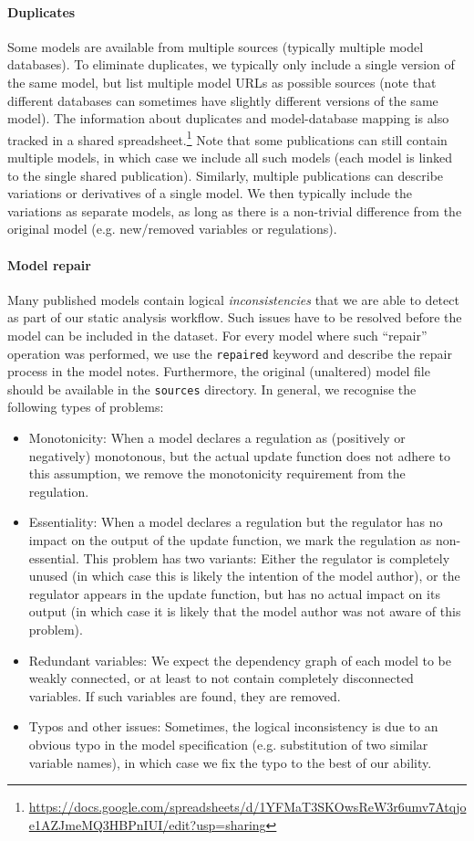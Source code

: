 \documentclass{article}
\begin{document}
\paragraph{Duplicates} Some models are available from multiple sources (typically multiple model databases). To eliminate duplicates, we typically only include a single version of the same model, but list multiple model URLs as possible sources (note that different databases can sometimes have slightly different versions of the same model). The information about duplicates and model-database mapping is also tracked in a shared spreadsheet.\footnote{\url{https://docs.google.com/spreadsheets/d/1YFMaT3SKOwsReW3r6umv7Atqjoe1AZJmeMQ3HBPnIUI/edit?usp=sharing}} Note that some publications can still contain multiple models, in which case we include all such models (each model is linked to the single shared publication). Similarly, multiple publications can describe variations or derivatives of a single model. We then typically include the variations as separate models, as long as there is a non-trivial difference from the original model (e.g. new/removed variables or regulations).

\paragraph{Model repair} Many published models contain logical \emph{inconsistencies} that we are able to detect as part of our static analysis workflow. Such issues have to be resolved before the model can be included in the dataset. For every model where such ``repair'' operation was performed, we use the \texttt{repaired} keyword and describe the repair process in the model notes. Furthermore, the original (unaltered) model file should be available in the \texttt{sources} directory. In general, we recognise the following types of problems:

\begin{itemize}
	\item Monotonicity: When a model declares a regulation as (positively or negatively) monotonous, but the actual update function does not adhere to this assumption, we remove the monotonicity requirement from the regulation.
	\item Essentiality: When a model declares a regulation but the regulator has no impact on the output of the update function, we mark the regulation as non-essential. This problem has two variants: Either the regulator is completely unused (in which case this is likely the intention of the model author), or the regulator appears in the update function, but has no actual impact on its output (in which case it is likely that the model author was not aware of this problem).
	\item Redundant variables: We expect the dependency graph of each model to be weakly connected, or at least to not contain completely disconnected variables. If such variables are found, they are removed.
	\item Typos and other issues: Sometimes, the logical inconsistency is due to an obvious typo in the model specification (e.g. substitution of two similar variable names), in which case we fix the typo to the best of our ability.
\end{itemize}
\end{document}
